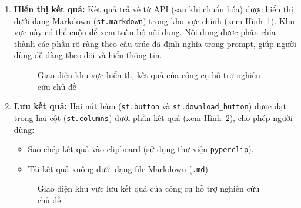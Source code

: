 \begin{enumerate}
    \item \textbf{Hiển thị kết quả:} Kết quả trả về từ API (sau khi chuẩn hóa) được hiển thị dưới dạng Markdown (\texttt{st.markdown}) trong khu vực chính (xem Hình~\ref{fig:research_result_area}). Khu vực này có thể cuộn để xem toàn bộ nội dung. Nội dung được phân chia thành các phần rõ ràng theo cấu trúc đã định nghĩa trong prompt, giúp người dùng dễ dàng theo dõi và hiểu thông tin.
    \begin{figure}[H]
        \centering
        \caption{Giao diện khu vực hiển thị kết quả của công cụ hỗ trợ nghiên cứu chủ đề}
        \label{fig:research_result_area}
    \end{figure}
    \vspace*{-14pt}

    \item \textbf{Lưu kết quả:} Hai nút bấm (\texttt{st.button} và \texttt{st.download\_button}) được đặt trong hai cột (\texttt{st.columns}) dưới phần kết quả (xem Hình~\ref{fig:research_save_result}), cho phép người dùng:
    \begin{itemize}
        \item Sao chép kết quả vào clipboard (sử dụng thư viện \texttt{pyperclip}).

        \item Tải kết quả xuống dưới dạng file Markdown (\texttt{.md}).        
    \end{itemize}
    \vspace*{-4pt}
    \begin{figure}[H]
        \centering
        \caption{Giao diện khu vực lưu kết quả của công cụ hỗ trợ nghiên cứu chủ đề}
        \label{fig:research_save_result}
    \end{figure}
\end{enumerate}

